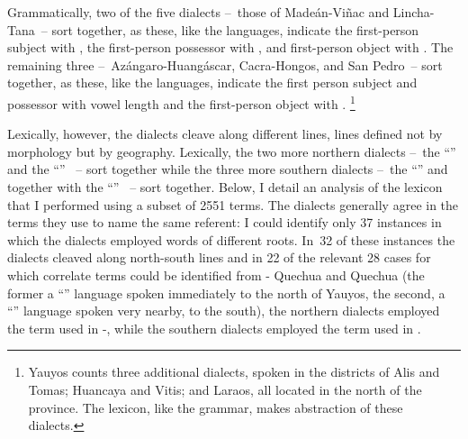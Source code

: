 Grammatically, two of the five dialects --~those of Madeán-Viñac and Lincha-Tana~-- sort together, as these, like the \QII{} languages, indicate the first-person subject with , the first-person possessor with , and first-person object with . The remaining three --~Azángaro-Huangáscar, Cacra-Hongos, and San Pedro~-- sort together, as these, like the \QI{} languages, indicate the first person subject and possessor with vowel length and the first-person object with .%
\footnote{Yauyos counts three additional dialects, spoken in the districts of Alis and Tomas; Huancaya and Vitis; and Laraos, all located in the north of the province. The lexicon, like the grammar, makes abstraction of these dialects.}

Lexically, however, the dialects cleave along different lines, lines defined not by morphology but by geography. Lexically, the two more northern dialects --~the “\QI” \CH{} and the “\QII” \LT~-- sort together while the three more southern dialects --~the “\QI” \AH{} and \SP{} together with the “\QII” \MV~-- sort together. Below, I detail an analysis of the lexicon that I performed using a subset of 2551 terms. The dialects generally agree in the terms they use to name the same referent: I could identify only 37 instances in which the dialects employed words of different roots. In~32 of these instances the dialects cleaved along north-south lines and in 22 of the relevant 28 cases for which correlate terms could be identified from - Quechua and  Quechua (the former a “\QI” language spoken immediately to the north of Yauyos, the second, a “\QII” language spoken very nearby, to the south), the northern dialects employed the term used in -, while the southern dialects employed the term used in .%
